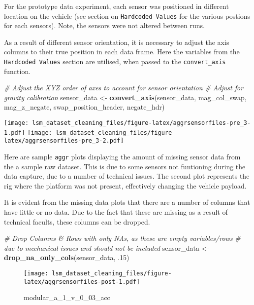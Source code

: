 \documentclass[]{article}
\newenvironment{Shaded}{\begin{snugshade}}{\end{snugshade}}
\newcommand{\CommentTok}[1]{\textcolor[rgb]{0.56,0.35,0.01}{\textit{#1}}}
\newcommand{\FloatTok}[1]{\textcolor[rgb]{0.00,0.00,0.81}{#1}}
\newcommand{\KeywordTok}[1]{\textcolor[rgb]{0.13,0.29,0.53}{\textbf{#1}}}
\newcommand{\NormalTok}[1]{#1}
\newcommand{\StringTok}[1]{\textcolor[rgb]{0.31,0.60,0.02}{#1}}
\begin{document}
For the prototype data experiment, each sensor was positioned in
different location on the vehicle (see section on
\texttt{Hardcoded\ Values} for the various postions for each sensors).
Note, the sensors were not altered between runs.

As a result of different sensor orientation, it is necessary to adjust
the axis columns to their true position in each data frame. Here the
variables from the \texttt{Hardcoded\ Values} section are utilised, when
passed to the \texttt{convert\_axis} function.

\begin{Shaded}
\begin{Highlighting}[]
\CommentTok{# Adjust the XYZ order of axes to account for sensor orientation}
\CommentTok{# Adjust for gravity calibration }
\NormalTok{sensor_data <-}\StringTok{ }\KeywordTok{convert_axis}\NormalTok{(sensor_data, mag_col_swap, mag_z_negate, }
\NormalTok{                            swap_position_header, negate_hdr)}
\end{Highlighting}
\end{Shaded}

\texttt{[image: lsm\_dataset\_cleaning\_files/figure-latex/aggrsensorfiles-pre\_3-1.pdf]}
\texttt{[image: lsm\_dataset\_cleaning\_files/figure-latex/aggrsensorfiles-pre\_3-2.pdf]}

Here are sample \texttt{aggr} plots displaying the amount of missing
sensor data from the a sample raw dataset. This is due to some sensors
not funtioning during the data capture, due to a number of technical
issues. The second plot represents the rig where the platform was not
present, effectively changing the vehicle payload.

It is evident from the missing data plots that there are a number of
columns that have little or no data. Due to the fact that these are
missing as a result of technical facults, these columns can be dropped.

\begin{Shaded}
\begin{Highlighting}[]
\CommentTok{# Drop Columns & Rows with only NAs, as these are empty variables/rows}
\CommentTok{# due to mechanical issues and should not be included}
\NormalTok{sensor_data <-}\StringTok{ }\KeywordTok{drop_na_only_cols}\NormalTok{(sensor_data, }\FloatTok{.15}\NormalTok{)}
\end{Highlighting}
\end{Shaded}

\begin{figure}
\centering
\texttt{[image: lsm\_dataset\_cleaning\_files/figure-latex/aggrsensorfiles-post-1.pdf]}
\caption{modular\_a\_1\_v\_0\_03\_acc}
\end{figure}
\end{document}

